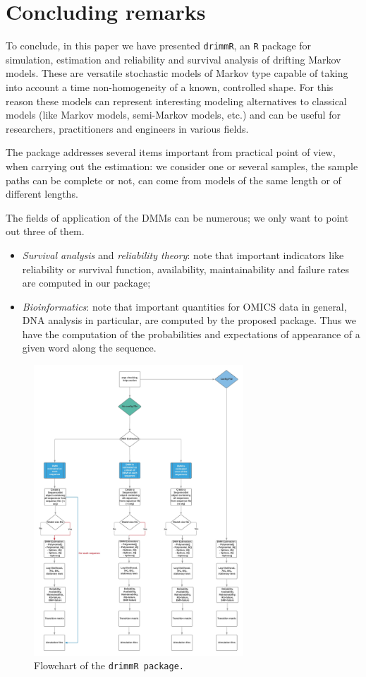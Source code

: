 \documentclass[article,nojss]{jss}\usepackage[]{graphicx}\usepackage[]{color}
\begin{document}
\clearpage

\section{Concluding remarks} \label{concluding}

To conclude, in this paper we have presented {\tt drimmR}, an {\tt R} package for  simulation, estimation and reliability and survival analysis of drifting Markov models. These are versatile stochastic models of Markov type capable of taking into account a time non-homogeneity of a known, controlled shape. For this reason these models can represent interesting modeling alternatives to classical models (like Markov models, semi-Markov models, etc.) and can be useful for researchers, practitioners and engineers in various fields.

The package addresses several items important from practical point of view, when carrying out the estimation: we consider one or several samples, the sample paths can be complete or not, can come from models of the same length or of different lengths.

The fields of application of the DMMs can be numerous; we only want to point out three of them.

\begin{itemize}
\item  \emph{Survival analysis} and \emph{reliability theory}: note that important indicators like reliability or survival function, availability, maintainability and failure rates are computed in our package;
\item  \emph{Bioinformatics}: note that important quantities for OMICS data in general,  DNA analysis in particular, are computed by the proposed package. Thus we have the computation of the  probabilities and expectations of  appearance of a given word along the sequence.

\end{itemize}


\clearpage

%



\begin{figure}[htbp]
\centering
\includegraphics[width=0.7\textwidth]{fig}
\caption{Flowchart of the \tt{drimmR} package. } \label{fig}
\end{figure}
\end{document}
